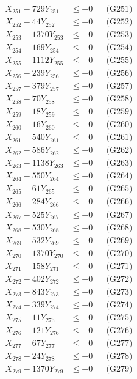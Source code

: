 \documentclass[a4paper,10pt]{article}
\begin{document}
{\begin{align}
\allowbreak
X_{251} - 729Y_{251} &\leq +0 && \text{(G251)} \\
X_{252} - 44Y_{252} &\leq +0 && \text{(G252)} \\
X_{253} - 1370Y_{253} &\leq +0 && \text{(G253)} \\
X_{254} - 169Y_{254} &\leq +0 && \text{(G254)} \\
X_{255} - 1112Y_{255} &\leq +0 && \text{(G255)} \\
X_{256} - 239Y_{256} &\leq +0 && \text{(G256)} \\
X_{257} - 379Y_{257} &\leq +0 && \text{(G257)} \\
X_{258} - 70Y_{258} &\leq +0 && \text{(G258)} \\
X_{259} - 18Y_{259} &\leq +0 && \text{(G259)} \\
X_{260} - 16Y_{260} &\leq +0 && \text{(G260)} \\
\allowbreak
X_{261} - 540Y_{261} &\leq +0 && \text{(G261)} \\
X_{262} - 586Y_{262} &\leq +0 && \text{(G262)} \\
X_{263} - 1138Y_{263} &\leq +0 && \text{(G263)} \\
X_{264} - 550Y_{264} &\leq +0 && \text{(G264)} \\
X_{265} - 61Y_{265} &\leq +0 && \text{(G265)} \\
X_{266} - 284Y_{266} &\leq +0 && \text{(G266)} \\
X_{267} - 525Y_{267} &\leq +0 && \text{(G267)} \\
X_{268} - 530Y_{268} &\leq +0 && \text{(G268)} \\
X_{269} - 532Y_{269} &\leq +0 && \text{(G269)} \\
X_{270} - 1370Y_{270} &\leq +0 && \text{(G270)} \\
\allowbreak
X_{271} - 158Y_{271} &\leq +0 && \text{(G271)} \\
X_{272} - 402Y_{272} &\leq +0 && \text{(G272)} \\
X_{273} - 843Y_{273} &\leq +0 && \text{(G273)} \\
X_{274} - 339Y_{274} &\leq +0 && \text{(G274)} \\
X_{275} - 11Y_{275} &\leq +0 && \text{(G275)} \\
X_{276} - 121Y_{276} &\leq +0 && \text{(G276)} \\
X_{277} - 67Y_{277} &\leq +0 && \text{(G277)} \\
X_{278} - 24Y_{278} &\leq +0 && \text{(G278)} \\
X_{279} - 1370Y_{279} &\leq +0 && \text{(G279)} \\

\end{align}}
\end{document}
